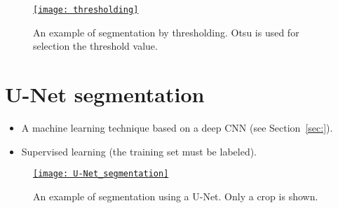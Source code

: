 \begin{figure}[H]
  \vspace{1ex}
  \centering
\href{https://github.com/vicente-gonzalez-ruiz/medical_imaging/blob/main/notebooks/thresholding.ipynb}{\texttt{[image: thresholding]}}
  \caption[An example of segmentation by thresholding.]{An example of
    segmentation by thresholding. Otsu is used for selection the
    threshold value.}
  \label{fig:thresholding}
\end{figure}

\section{U-Net segmentation \cite{ronneberger2015u}}

\begin{itemize}
\item A machine learning technique based on a deep \gls{CNN} (see Section~\ref{sec:}).
\item Supervised learning (the training set must be labeled).
\end{itemize}



\begin{figure}[H]
  \vspace{1ex}
  \centering
\href{https://github.com/vicente-gonzalez-ruiz/medical_imaging/blob/main/notebooks/unet_cell_data.ipynb}{\texttt{[image: U-Net\_segmentation]}}
  \caption[An example of segmentation using a U-Net.]{An example of
    segmentation using a U-Net. Only a crop is shown.}
  \label{fig:U-Net_segmentatin}
\end{figure}

